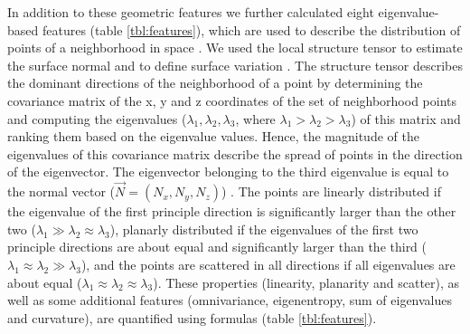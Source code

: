 In addition to these geometric features we further calculated eight eigenvalue-based features (table \ref{tbl:features}), which are used to describe the distribution of points of a neighborhood in space \citep{hoppe1992surface, chehata2009airborne}. We used the local structure tensor to estimate the surface normal and to define surface variation \citep{pauly2002efficient}. The structure tensor describes the dominant directions of the neighborhood of a point by determining the covariance matrix of the x, y and z coordinates of the set of neighborhood points and computing the eigenvalues (\(\lambda_{1}, \lambda_{2}, \lambda_{3}\), where \(\lambda_{1} > \lambda_{2} > \lambda_{3}\)) of this matrix and ranking them based on the eigenvalue values. Hence, the magnitude of the eigenvalues of this covariance matrix describe the spread of points in the direction of the eigenvector. The eigenvector belonging to the third eigenvalue is equal to the normal vector (\(\vec{N} = (N_{x}, N_{y}, N_{z})\)) \citep{pauly2002efficient}. The points are linearly distributed if the eigenvalue of the first principle direction is significantly larger than the other two (\(\lambda_{1} \gg \lambda_{2} \approx \lambda_{3}\)), planarly distributed if the eigenvalues of the first two principle directions are about equal and significantly larger than the third (\(\lambda_{1} \approx \lambda_{2} \gg \lambda_{3}\)), and the points are scattered in all directions if all eigenvalues are about equal (\(\lambda_{1} \approx \lambda_{2} \approx \lambda_{3}\)). These properties (linearity, planarity and scatter), as well as some additional features (omnivariance, eigenentropy, sum of eigenvalues and curvature), are quantified using formulas (table \ref{tbl:features}).

